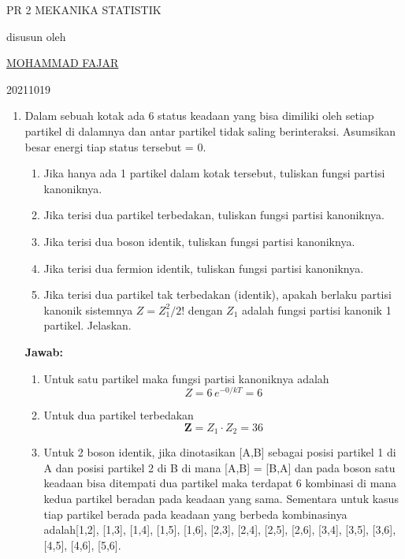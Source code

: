 \documentclass[a4paper , 12 pt]{article}
\begin{document}
\begin{singlespace}

\begin{center}
\large{PR 2 MEKANIKA STATISTIK}

disusun oleh 

\underline{MOHAMMAD FAJAR}

20211019

\end{center}
\end{singlespace}
\begin{enumerate}
\item Dalam sebuah kotak ada 6 status keadaan yang bisa dimiliki oleh setiap partikel di dalamnya dan antar partikel tidak saling berinteraksi. Asumsikan besar energi tiap status tersebut = 0. 
\begin{enumerate}
\item Jika hanya ada 1 partikel dalam kotak tersebut, tuliskan fungsi partisi kanoniknya. 
\item Jika terisi dua partikel terbedakan, tuliskan fungsi partisi kanoniknya.
\item Jika terisi dua boson identik, tuliskan fungsi partisi kanoniknya. 
\item Jika terisi dua fermion identik, tuliskan fungsi partisi kanoniknya. 
\item Jika terisi dua partikel tak terbedakan (identik), apakah berlaku partisi kanonik sistemnya $Z = \displaystyle Z_1^2 / 2! $ dengan $Z_1$ adalah fungsi partisi kanonik 1 partikel. Jelaskan. 
\end{enumerate}
\textbf{Jawab:}
\begin{enumerate}
\item Untuk satu partikel maka fungsi partisi kanoniknya adalah
\[
Z = 6\, e^{- 0/kT} = 6
\]
\item Untuk dua partikel terbedakan
\[
\boldsymbol{Z} = Z_1 \cdot Z_2 = 36 
\]
\item Untuk 2 boson identik, jika dinotasikan [A,B] sebagai posisi partikel 1 di A dan posisi partikel 2 di B di mana [A,B] = [B,A] dan pada boson satu keadaan bisa ditempati dua partikel maka terdapat 6 kombinasi di mana kedua partikel beradan pada keadaan  yang sama. Sementara untuk kasus tiap partikel berada pada keadaan yang berbeda kombinasinya adalah[1,2], [1,3], [1,4], [1,5], [1,6], [2,3], [2,4], [2,5], [2,6], [3,4], [3,5], [3,6], [4,5], [4,6], [5,6].

\end{enumerate}
\end{enumerate}
\end{document}
